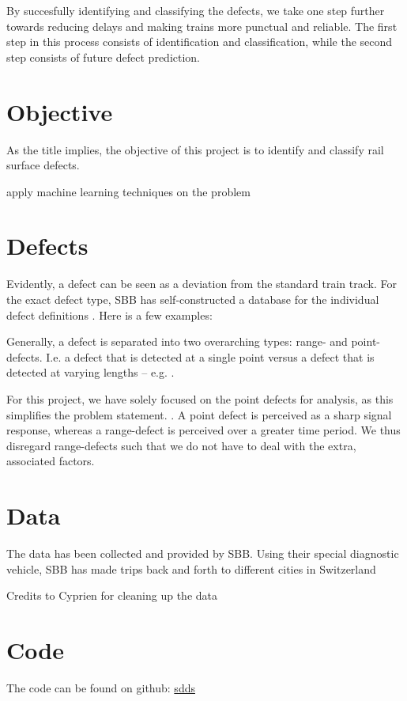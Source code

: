 By succesfully identifying and classifying the defects, we take one step further towards reducing delays and making trains more punctual and reliable. The first step in this process consists of identification and classification, while the second step consists of future defect prediction.

\section{Objective}
As the title implies, the objective of this project is to identify and classify rail surface defects. 

apply machine learning techniques on the problem

\section{Defects}
Evidently, a defect can be seen as a deviation from the standard train track. For the exact defect type, SBB has self-constructed a database for the individual defect definitions . Here is a few examples: 


Generally, a defect is separated into two overarching types: range- and point-defects. I.e. a defect that is detected at a single point versus a defect that is detected at varying lengths -- e.g. .

For this project, we have solely focused on the point defects for analysis, as this simplifies the problem statement. . A point defect is perceived as a sharp signal response, whereas a range-defect is perceived over a greater time period. We thus disregard range-defects such that we do not have to deal with the extra, associated factors. 



\section{Data}
The data has been collected and provided by SBB. Using their special diagnostic vehicle, SBB has made trips back and forth to different cities in Switzerland


Credits to Cyprien for cleaning up the data

\section{Code}
The code can be found on github: \url{sdds}


